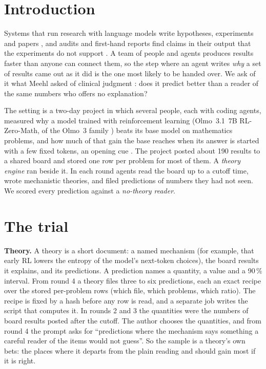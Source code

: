 \documentclass[10pt]{article}
\begin{document}
\section{Introduction}

Systems that run research with language models write hypotheses, experiments and papers
\cite{lu2024aiscientist,gottweis2025coscientist}, and audits and first-hand reports find claims in their output
that the experiments do not support \cite{beel2025sakana,luo2025pitfalls,trehan2026why}. A team of people and
agents produces results faster than anyone can connect them, so the step where an agent writes \emph{why} a set of
results came out as it did is the one most likely to be handed over. We ask of it what Meehl asked of clinical judgment \cite{meehl1954clinical}: does it predict better than
a reader of the same numbers who offers no explanation?

The setting is a two-day project in which several people, each with coding agents, measured why a model trained
with reinforcement learning (Olmo~3.1~7B RL-Zero-Math, of the Olmo~3 family \cite{ettinger2025olmo}) beats its
base model on mathematics problems, and how much of that gain the base reaches when its answer is started with a
few fixed tokens, an opening cue \cite{wang2026base}. The project posted about 190 results to a shared board and
stored one row per problem for most of them. A \emph{theory engine} ran beside it. In each round agents read the
board up to a cutoff time, wrote mechanistic theories, and filed predictions of numbers they had not seen. We
scored every prediction against a \emph{no-theory reader}.

\section{The trial}

\textbf{Theory.} A theory is a short document: a named mechanism (for example, that early RL lowers the entropy
of the model's next-token choices), the board results it explains, and its predictions. A prediction names a
quantity, a value and a 90\,\% interval. From round 4 a theory files three to six predictions, each an exact recipe
over the stored per-problem rows (which file, which problems, which ratio). The recipe is fixed by a hash before
any row is read, and a separate job writes the script that computes it. In rounds 2 and 3 the quantities were the
numbers of board results posted after the cutoff. The author chooses the quantities, and from round 4 the prompt asks for
``predictions where the mechanism says something a careful reader of the items would not guess''. So the sample is
a theory's own bets: the places where it departs from the plain reading and should gain most if it is right.
\end{document}
